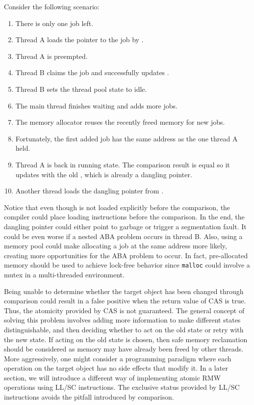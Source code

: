 \documentclass[fontsize=10pt, oneside]{scrartcl}
\newcommand{\monobox}[1]{\mbox{\texttt{#1}}}
\begin{document}
Consider the following scenario:
\begin{enumerate}
    \item There is only one job left.
    \item Thread A loads the pointer to the job by .
    \item Thread A is preempted.
    \item Thread B claims the job and successfully updates .
    \item Thread B sets the thread pool state to idle.
    \item The main thread finishes waiting and adds more jobs.
    \item The memory allocator reuses the recently freed memory for new jobs.
    \item Fortunately, the first added job has the same address as the one thread A held.
    \item Thread A is back in running state. The comparison result is equal so it updates  with the old , which is already a dangling pointer.
    \item Another thread loads the dangling pointer from .
\end{enumerate}

Notice that even though  is not loaded explicitly before the comparison, the compiler could place loading instructions before the comparison.
In the end, the dangling pointer could either point to garbage or trigger a segmentation fault.
It could be even worse if a nested ABA problem occurs in thread B.
Also, using a memory pool could make allocating a job at the same address more likely, creating more opportunities for the ABA problem to occur.
In fact, pre-allocated memory should be used to achieve lock-free behavior since \monobox{malloc} could involve a mutex in a multi-threaded environment.

Being unable to determine whether the target object has been changed through comparison could result in a false positive when the return value of CAS is true.
Thus, the atomicity provided by CAS is not guaranteed.
The general concept of solving this problem involves adding more information to make different states distinguishable, and then deciding whether to act on the old state or retry with the new state.
If acting on the old state is chosen, then safe memory reclamation should be considered as memory may have already been freed by other threads.
More aggressively, one might consider a programming paradigm where each operation on the target object has no side effects that modify it.
In a later section, we will introduce a different way of implementing atomic \textsc{RMW} operations using LL/SC instructions. The exclusive status provided by LL/SC instructions avoids the pitfall introduced by comparison.
\end{document}
